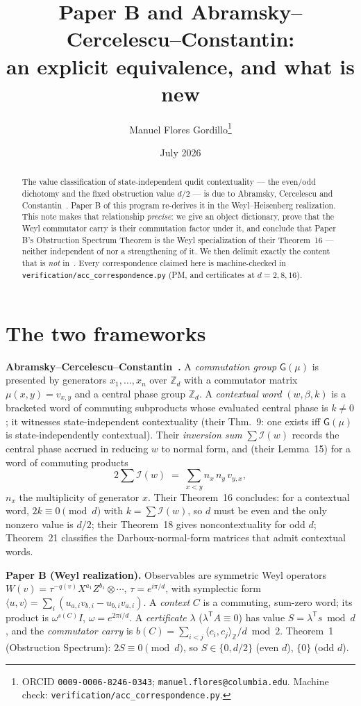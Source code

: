 \documentclass[11pt]{article}
\title{Paper B and Abramsky--Cercelescu--Constantin:\\ an explicit equivalence, and what is new}
\author{Manuel Flores Gordillo\thanks{ORCID \texttt{0009-0006-8246-0343};
\texttt{manuel.flores@columbia.edu}. Machine check: \texttt{verification/acc\_correspondence.py}.}}
\date{July 2026}
\newcommand{\Z}{\mathbb{Z}}
\newcommand{\ip}[2]{\langle #1,#2\rangle}
\begin{document}
\maketitle

\begin{abstract}
The value classification of state-independent qudit contextuality --- the even/odd dichotomy and the
fixed obstruction value $d/2$ --- is due to Abramsky, Cercelescu and Constantin~\cite{ACC24}. Paper B
of this program re-derives it in the Weyl--Heisenberg realization. This note makes that relationship
\emph{precise}: we give an object dictionary, prove that the Weyl commutator carry is their commutation
factor under it, and conclude that Paper B's Obstruction Spectrum Theorem is the Weyl specialization of
their Theorem~16 --- neither independent of nor a strengthening of it. We then delimit exactly the
content that is \emph{not} in~\cite{ACC24}. Every correspondence claimed here is machine-checked in
\texttt{verification/acc\_correspondence.py} (PM, and certificates at $d=2,8,16$).
\end{abstract}

\section{The two frameworks}
\textbf{Abramsky--Cercelescu--Constantin~\cite{ACC24}.} A \emph{commutation group} $\mathsf{G}(\mu)$ is
presented by generators $x_1,\dots,x_n$ over $\Z_d$ with a commutator matrix $\mu(x,y)=v_{x,y}$ and a
central phase group $\Z_d$. A \emph{contextual word} $(w,\beta,k)$ is a bracketed word of
commuting subproducts whose evaluated central phase is $k\neq0$; it witnesses state-independent
contextuality (their Thm.~9: one exists iff $\mathsf{G}(\mu)$ is state-independently contextual). Their
\emph{inversion sum} $\sum\mathcal I(w)$ records the central phase accrued in reducing $w$ to normal
form, and (their Lemma~15) for a word of commuting products
\begin{equation}\label{eq:acc}
2\sum\mathcal I(w)\;=\;\sum_{x<y} n_x\,n_y\,v_{y,x},
\end{equation}
$n_x$ the multiplicity of generator $x$. Their Theorem~16 concludes: for a contextual word,
$2k\equiv0\pmod d$ with $k=\sum\mathcal I(w)$, so $d$ must be even and the only nonzero value is $d/2$;
their Theorem~18 gives noncontextuality for odd $d$; Theorem~21 classifies the Darboux-normal-form
matrices that admit contextual words.

\medskip
\noindent\textbf{Paper B (Weyl realization).} Observables are symmetric Weyl operators
$W(v)=\tau^{-q(v)}X^{a_1}Z^{b_1}\otimes\cdots$, $\tau=e^{i\pi/d}$, with symplectic form
$\ip{u}{v}=\sum_i(u_{a,i}v_{b,i}-u_{b,i}v_{a,i})$. A \emph{context} $C$ is a commuting, sum-zero word;
its product is $\omega^{s(C)}I$, $\omega=e^{2\pi i/d}$. A \emph{certificate} $\lambda$
($\lambda^{\mathsf T}A\equiv0$) has value $S=\lambda^{\mathsf T}s\bmod d$, and the \emph{commutator
carry} is $b(C)=\sum_{i<j}\ip{c_i}{c_j}_{\Z}/d\bmod2$. Theorem~1 (Obstruction Spectrum): $2S\equiv0
\pmod d$, so $S\in\{0,d/2\}$ (even $d$), $\{0\}$ (odd $d$).
\end{document}
